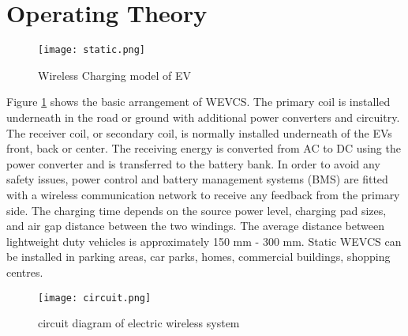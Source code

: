 \documentclass[12pt]{article}
\begin{document}
\section{Operating Theory}
\begin{figure}[h]
	\centering
	\texttt{[image: static.png]}
	\caption{Wireless Charging model of EV}
	\label{fig:WEV}
\end{figure}
Figure \ref{fig:WEV} shows the basic arrangement of WEVCS. The primary coil is installed underneath in the road or ground with additional power converters and circuitry. The receiver coil, or secondary coil, is normally installed underneath of the EVs front, back
or center. The receiving energy is converted from AC to DC using the power converter and is transferred to the battery bank. In order to avoid any safety issues, power control and battery management systems (BMS) are fitted with a wireless communication network to receive any feedback from the primary side. The charging time depends on the source power level, charging pad sizes, and air gap distance between the two windings. The average distance between lightweight duty vehicles is approximately 150 mm - 300 mm. Static WEVCS can be installed in parking areas, car parks, homes, commercial buildings, shopping centres. \cite{pl2018}
\begin{figure}[h]
	\centering
	\texttt{[image: circuit.png]}
	\caption{circuit diagram of electric wireless system}
	\label{fig:ckt}
\end{figure}
 \newpage 
  


\end{document}
